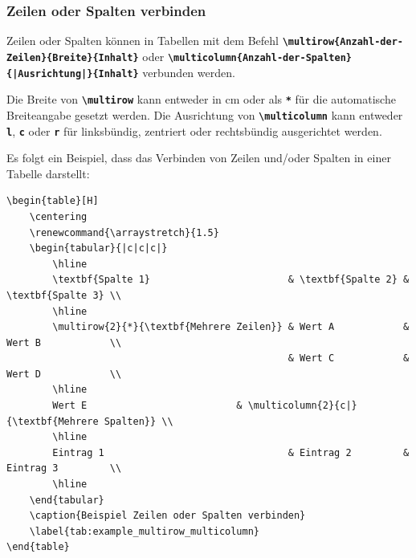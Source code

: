 \subsubsection{Zeilen oder Spalten verbinden}
Zeilen oder Spalten können in Tabellen mit dem Befehl \newline \textbf{\texttt{\textbackslash multirow\{Anzahl-der-Zeilen\}\{Breite\}\{Inhalt\}}} oder \newline \textbf{\texttt{\textbackslash multicolumn\{Anzahl-der-Spalten\}\{|Ausrichtung|\}\{Inhalt\}}} verbunden werden.

Die Breite von \textbf{\texttt{\textbackslash multirow}} kann entweder in cm oder als \textbf{\texttt{*}} für die automatische Breiteangabe gesetzt werden. Die Ausrichtung von \textbf{\texttt{\textbackslash multicolumn}} kann entweder \textbf{\texttt{l}}, \textbf{\texttt{c}} oder \textbf{\texttt{r}} für linksbündig, zentriert oder rechtsbündig ausgerichtet werden.

Es folgt ein Beispiel, dass das Verbinden von Zeilen und/oder Spalten in einer Tabelle darstellt:

\begin{lstlisting}[language={[LaTeX]TeX}, basicstyle=\scriptsize]
\begin{table}[H]
    \centering
    \renewcommand{\arraystretch}{1.5}
    \begin{tabular}{|c|c|c|}
        \hline
        \textbf{Spalte 1}                        & \textbf{Spalte 2} & \textbf{Spalte 3} \\
        \hline
        \multirow{2}{*}{\textbf{Mehrere Zeilen}} & Wert A            & Wert B            \\
                                                 & Wert C            & Wert D            \\
        \hline
        Wert E                          & \multicolumn{2}{c|}{\textbf{Mehrere Spalten}} \\
        \hline
        Eintrag 1                                & Eintrag 2         & Eintrag 3         \\
        \hline
    \end{tabular}
    \caption{Beispiel Zeilen oder Spalten verbinden}
    \label{tab:example_multirow_multicolumn}
\end{table}
\end{lstlisting}

